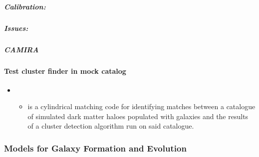 \documentclass[letterpaper,10pt,english]{sphinxmanual}
\begin{document}
\subparagraph{Calibration:}
\label{\detokenize{resource/astro/topics/cluster_finder:calibration}}

\subparagraph{Issues:}
\label{\detokenize{resource/astro/topics/cluster_finder:issues}}

\subparagraph{CAMIRA}
\label{\detokenize{resource/astro/topics/cluster_finder:camira}}

\paragraph{Test cluster finder in mock catalog}
\label{\detokenize{resource/astro/topics/cluster_finder:test-cluster-finder-in-mock-catalog}}\begin{itemize}
\item {} 
\begin{itemize}
\item {} 
 is a cylindrical matching code for identifying
matches between a catalogue of simulated dark matter haloes
populated with galaxies and the results of a cluster detection
algorithm run on said catalogue.

\end{itemize}

\end{itemize}


\subsubsection{Models for Galaxy Formation and Evolution}
\label{\detokenize{resource/astro/topics/galaxy_formation_model:models-for-galaxy-formation-and-evolution}}\label{\detokenize{resource/astro/topics/galaxy_formation_model::doc}}
\end{document}
